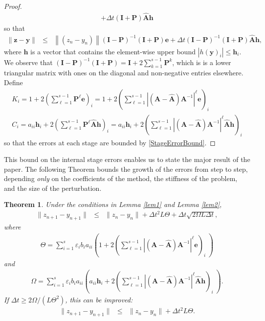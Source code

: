 \documentclass{siamart251104}
\newtheorem{thm}{Theorem}
\newcommand{\dt}{\Delta t}
\newcommand{\m}[1]{\mathbf{#1}}
\newcommand{\vy}{\m{y}}
\newcommand{\vz}{\m{z}}
\newcommand{\ve}{\m{e}}
\newcommand{\vh}{\m{h}}
\newcommand{\mQ}{\m{P}} %
\newcommand{\mI}{\m{I}}
\newcommand{\mA}{\m{A}}
\newcommand{\mAh}{\m{\hat{A}}}
\begin{document}
\begin{proof}
\begin{eqnarray*}
+ \dt   \left( \mI + \mQ \right) \mAh  \vh
\end{eqnarray*}
so that
\begin{eqnarray*}
\| \vz - \vy \| & \leq  & \left\|   (z_n - y_n)  \right\| 
\left(\mI - \mQ \right)^{-1} \left(\mI + \mQ \right) \ve 
+  \dt \left(\mI - \mQ \right)^{-1} 
\left( \mI + \mQ \right) \mAh \vh ,
\end{eqnarray*}
where $\vh$ is a vector that contains the element-wise upper bound   $\left|h(\vy)_i\right| \leq \vh_i $. We observe that 
$ \left(\mI - \mQ \right)^{-1} \left(\mI + \mQ \right) 
= \mI + 2 \sum_{k=1}^{s-1} \mQ^k $, which is 
is a lower triangular matrix with ones on the diagonal and non-negative entries elsewhere.
Define
\begin{eqnarray*}
K_i  =     1 + 2 \left( \sum_{\ell =1}^{s-1} \mQ^\ell \ve \right)_i 
= 1 + 2 \left( \sum_{\ell =1}^{s-1} 
\left| (\mA- \mAh) \mA^{-1} \right|^\ell \ve \right)_i \\
C_i  =   a_{ii} \vh_i +  2 \left( \sum_{\ell =1}^{s-1} \mQ^\ell \mAh \vh \right)_i  
=   a_{ii} \vh_i +  2 \left( \sum_{\ell =1}^{s-1} \left| (\mA- \mAh) \mA^{-1} \right|^\ell \mAh \vh \right)_i 
\end{eqnarray*}
so that the  errors at each stage are bounded 
by \eqref{StageErrorBound}.

\end{proof}

This bound on the internal stage errors enables us to state 
the major result of the paper. The following Theorem bounds the
growth of the errors from step to step, depending {\em only} 
on the coefficients of the
method, the stiffness of the problem, 
and the size of the perturbation.

\smallskip

\begin{thm} \label{thm:FinalConv}
Under the conditions in Lemma \ref{lem1} and 
Lemma \ref{lem2}, 
\begin{eqnarray} \label{ErrorGrowth1}
\|z_{n+1} - y_{n+1}\| & \leq & \|z_n - y_n\|
+ \dt^2 L \Theta +  \dt \sqrt{2 \Omega L \dt} ,
\end{eqnarray}
where
\begin{eqnarray*}
\Theta = \sum_{i=1}^s \varepsilon_i b_{i} a_{ii} 
\left(1 + 2 \left( \sum_{\ell =1}^{s-1} \left| (\mA- \mAh) \mA^{-1} \right|^\ell \ve \right)_i \; \right)
\end{eqnarray*}
and
\begin{eqnarray*}
\Omega = \sum_{i=1}^s \varepsilon_i  b_{i} a_{ii}  
\left(  a_{ii} \vh_i +  2 \left( \sum_{\ell =1}^{s-1} \left| (\mA- \mAh) \mA^{-1} \right|^\ell \mAh \vh \right)_i \; \right).
\end{eqnarray*}
If $\dt \geq 2 \Omega/(L \Theta^2)$, this
can be improved:
\begin{eqnarray} \label{ErrorGrowth2}
\|z_{n+1} - y_{n+1}\| & \leq & \|z_n - y_n\|
+   \dt^2 L \Theta . 
\end{eqnarray}
\end{thm}
\end{document}
